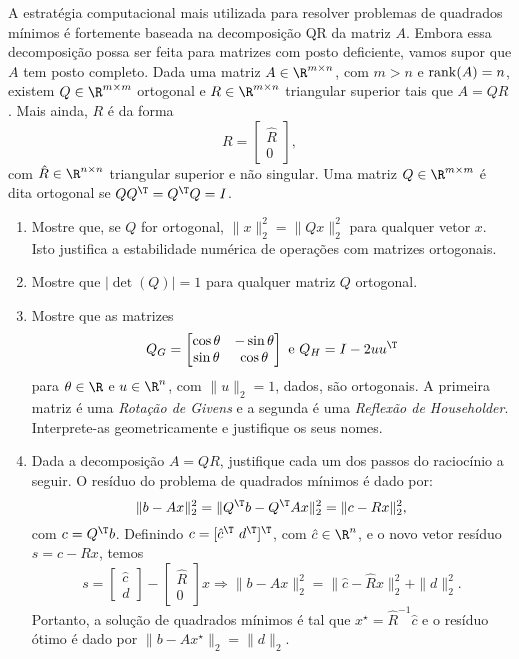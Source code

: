 \begin{problem}
A estratégia computacional mais utilizada para resolver problemas de quadrados mínimos é fortemente baseada na decomposição QR da matriz $A$. Embora essa decomposição possa ser feita para matrizes com posto deficiente, vamos supor que $A$ tem posto completo. Dada uma matriz $A \in \R^{m \times n}$, com $m > n$ e ${\rm rank}(A) = n$, existem $Q \in \R^{m \times m}$ ortogonal e $R \in \R^{m \times n}$ triangular superior tais que $A = QR$. Mais ainda, $R$ é da forma
\[
R = \begin{bmatrix}
\hat R \\ 0
\end{bmatrix},
\]
com $\hat R \in \R^{n \times n}$ triangular superior e não singular. Uma matriz $Q \in \R^{m \times m}$ é dita ortogonal se $QQ^\T = Q^\T Q = I$.
\begin{enumerate}[label=(\alph*)]
\item Mostre que, se $Q$ for ortogonal, $\|x\|_2^2 = \|Qx\|_2^2$ para qualquer vetor $x$. Isto justifica a estabilidade numérica de operações com matrizes ortogonais.
\item Mostre que $|\det (Q)| = 1$ para qualquer matriz $Q$ ortogonal.
\item Mostre que as matrizes
\[
Q_G = \begin{bmatrix}
\cos \theta & -\sin \theta \\
\sin \theta & \cos \theta
\end{bmatrix} ~\text{e}~ Q_H = I - 2uu^\T
\]
para $\theta \in \R$ e $u \in \R^n$, com $\|u\|_2 = 1$, dados, são ortogonais. A primeira matriz é uma {\em Rotação de Givens} e a segunda é uma {\em Reflexão de Householder}. Interprete-as geometricamente e justifique os seus nomes.
\item Dada a decomposição $A = QR$, justifique cada um dos passos do raciocínio a seguir. O resíduo do problema de quadrados mínimos é dado por:
\[
\|b - Ax\|_2^2 = \|Q^\T b - Q^\T A x\|_2^2 = \|c - Rx\|_2^2,
\]
com $c = Q^\T b$. Definindo $c = [\hat c^\T~d^\T]^\T$, com $\hat c \in \R^n$, e o novo vetor resíduo $s = c - Rx$, temos
\[
s = \begin{bmatrix}
\hat c \\ d
\end{bmatrix} - \begin{bmatrix}
\hat R \\ 0 
\end{bmatrix}x \Rightarrow \|b - Ax\|_2^2 = \|\hat c - \hat R x\|_2^2 + \|d\|_2^2.
\]
Portanto, a solução de quadrados mínimos é tal que $x^\star = \hat R^{-1} \hat c$ e o resíduo ótimo é dado por $\|b - Ax^\star\|_2 = \|d\|_2$.
\end{enumerate}
\end{problem}

